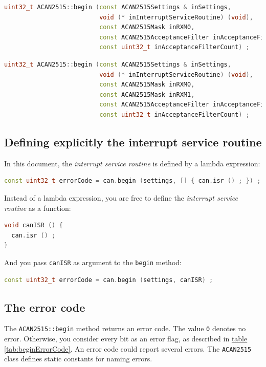 \documentclass[10pt, a4paper, obeyspaces, openany]{extarticle}
\newcommand \subsectionLabel[2]{\subsection{#1}\label{subsec:#2}}
\newcommand\refTableau[1]{\hyperref[tab:#1]{table \ref*{tab:#1}}}
\begin{document}
{ \small\begin{lstlisting}[language=c++]
uint32_t ACAN2515::begin (const ACAN2515Settings & inSettings,
                          void (* inInterruptServiceRoutine) (void),
                          const ACAN2515Mask inRXM0,
                          const ACAN2515AcceptanceFilter inAcceptanceFilters [],
                          const uint32_t inAcceptanceFilterCount) ;
\end{lstlisting}}

{ \small\begin{lstlisting}[language=c++]
uint32_t ACAN2515::begin (const ACAN2515Settings & inSettings,
                          void (* inInterruptServiceRoutine) (void),
                          const ACAN2515Mask inRXM0,
                          const ACAN2515Mask inRXM1,
                          const ACAN2515AcceptanceFilter inAcceptanceFilters [],
                          const uint32_t inAcceptanceFilterCount) ;
\end{lstlisting}}



\subsectionLabel{Defining explicitly the interrupt service routine}{isrExplicit}

In this document, the \emph{interrupt service routine} is defined by a lambda expression:
{ \small\begin{lstlisting}[language=c++]
  const uint32_t errorCode = can.begin (settings, [] { can.isr () ; }) ;
\end{lstlisting}}

Instead of a lambda expression, you are free to define the \emph{interrupt service routine} as a function:
{ \small\begin{lstlisting}[language=c++]
void canISR () {
  can.isr () ;
}
\end{lstlisting}}

And you pass \texttt{canISR} as argument to the \texttt{begin} method:
{ \small\begin{lstlisting}[language=c++]
  const uint32_t errorCode = can.begin (settings, canISR) ;
\end{lstlisting}}


\subsectionLabel{The error code}{errorCodeMethodBegin}

The \texttt{ACAN2515::begin} method returns an error code. The value \texttt{0} denotes no error. Otherwise, you consider every bit as an error flag, as described in \refTableau{beginErrorCode}. An error code could report several errors. The \texttt{ACAN2515} class defines static constants for naming errors.
\end{document}
